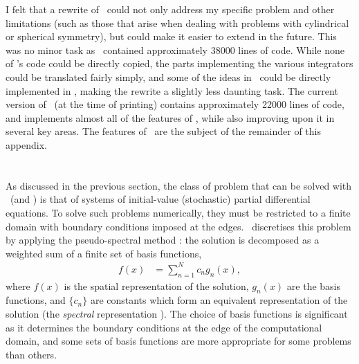 I felt that a rewrite of \XMDS\ could not only address my specific problem and other limitations (such as those that arise when dealing with problems with cylindrical or spherical symmetry), but could make it easier to extend in the future.  This was no minor task as \XMDS\ contained approximately 38000 lines of code.  While none of \XMDS's code could be directly copied, the parts implementing the various integrators could be translated fairly simply, and some of the ideas in \XMDS\ could be directly implemented in \xpdeint, making the rewrite a slightly less daunting task.  The current version of \xpdeint\ (at the time of printing) contains approximately 22000 lines of code, and implements almost all of the features of \XMDS, while also improving upon it in several key areas.  The features of \xpdeint\ are the subject of the remainder of this appendix.

\section{\xpdeint}


As discussed in the previous section, the class of problem that can be solved with \xpdeint\ (and \XMDS) is that of systems of initial-value (stochastic) partial differential equations.  To solve such problems numerically, they must be restricted to a finite domain with boundary conditions imposed at the edges.  \xpdeint\ discretises this problem by applying the pseudo-spectral method \citep{SpectralMethods}: the solution is decomposed as a weighted sum of a finite set of basis functions,
\begin{align}
    f(x) &= \sum_{n=1}^{N} c_n g_n(x),
\end{align}
where $f(x)$ is the spatial representation of the solution, $g_n(x)$ are the basis functions, and $\{c_n\}$ are constants which form an equivalent representation of the solution (the \emph{spectral} representation \citep{SpectralMethods}).  The choice of basis functions is significant as it determines the boundary conditions at the edge of the computational domain, and some sets of basis functions are more appropriate for some problems than others.  


